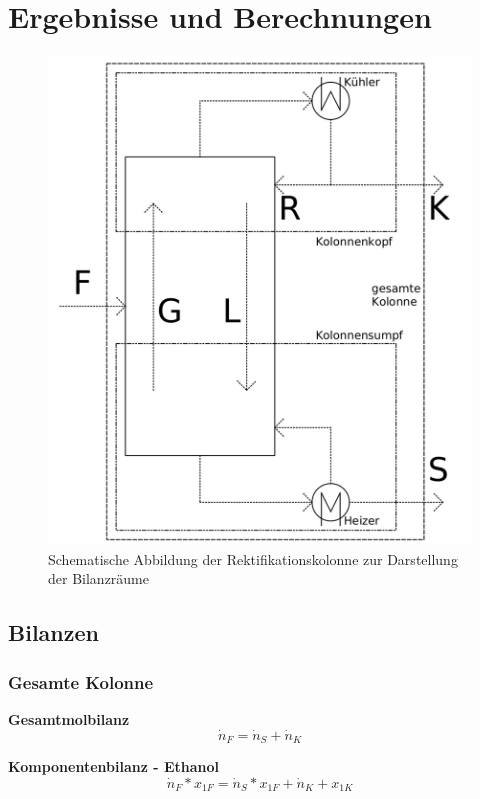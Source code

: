 \newpage
\section{Ergebnisse und Berechnungen}
\label{sec:ergebnisse}
\begin{figure}[h!]
	\centering
	\includegraphics[width=0.7\linewidth]{img/Bilanzraumm}
	\caption{Schematische Abbildung der Rektifikationskolonne zur Darstellung der Bilanzräume}
	\label{fig:Bilanzraumm}
\end{figure}
\FloatBarrier
\subsection{Bilanzen}
\subsubsection{Gesamte Kolonne}

\hspace{5mm}\textbf{Gesamtmolbilanz}\\
\begin{equation}\label{gl:gesamtmolbilanzKOLONNE}
\dot{n}_F=\dot{n}_S+\dot{n}_K
\end{equation}

\hspace{5mm}\textbf{Komponentenbilanz - Ethanol} \\
\begin{equation}\label{gl:komponentenbilanzKOLONNE}
\dot{n}_F*x_{1F}=\dot{n}_S*x_{1F}+\dot{n}_K+x_{1K}
\end{equation}

